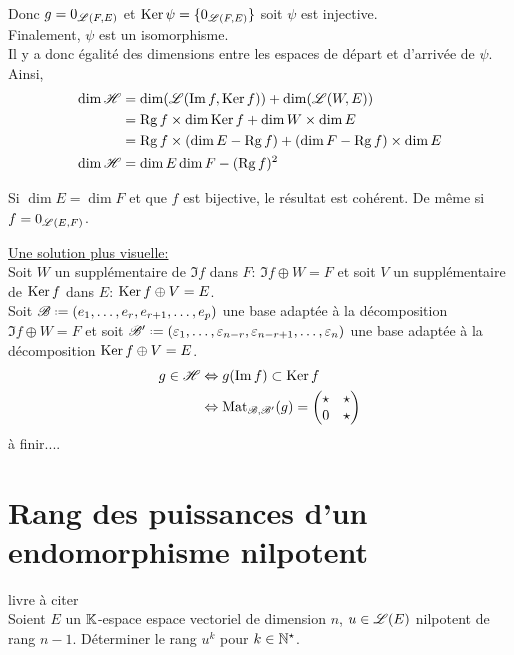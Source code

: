 \begin{solution}
\begin{itemize}
\begin{itemize}
            Donc $g = 0_{\mathscr{L}(F, E)}$ et $\mathrm{Ker}\, \psi = \{ 0_{\mathscr{L}(F, E)} \}$ soit $\psi$ est injective. \\
            Finalement, $\psi$ est un isomorphisme. \\
            Il y a donc égalité des dimensions entre les espaces de départ et d'arrivée de $\psi$. Ainsi,
            \begin{align*}
                \dim \mathscr{H} &= \dim(\mathscr{L}(\Im f, \mathrm{Ker}\, f)) + \dim (\mathscr{L}(W, E)) \\
                &= \mathrm{Rg}\, f \times \dim \mathrm{Ker}\, f + \dim W \times \dim E \\
                &= \mathrm{Rg}\, f \times (\dim E - \mathrm{Rg}\, f) + (\dim F - \mathrm{Rg}\, f) \times \dim E \\
                \dim \mathscr{H} &= \dim E \dim F - (\mathrm{Rg}\, f)^2
            \end{align*}
        \end{itemize}
        \begin{remarque}
            Si $\dim E = \dim F$ et que $f$ est bijective, le résultat est cohérent. De même si $f = 0_{\mathscr{L}(E, F)}$.
        \end{remarque}
    \end{itemize}
    \underline{Une solution plus visuelle:} \\
    Soit $W$ un supplémentaire de $\Im f$ dans $F$: $\Im f \oplus W = F$ et soit $V$ un supplémentaire de $\mathrm{Ker}\, f$ dans $E$: $\mathrm{Ker}\, f \oplus V = E$. \\
    Soit $\mathscr{B} \defeq (e_1, \dots, e_r, e_{r+1}, \dots, e_p)$ une base adaptée à la décomposition $\Im f \oplus W = F$ et soit $\mathscr{B}' \defeq (\varepsilon_1, \dots, \varepsilon_{n-r}, \varepsilon_{n-r+1}, \dots, \varepsilon_n)$ une base adaptée à la décomposition $\mathrm{Ker}\, f \oplus V = E$.
    \begin{align*}
        g \in \mathscr{H} &\Leftrightarrow g(\Im f) \subset \mathrm{Ker}\, f \\
        &\Leftrightarrow \mathrm{Mat}_{\mathscr{B}, \mathscr{B}'}(g) = 
        \begin{pmatrix}
            \star & \star \\
            0 & \star
        \end{pmatrix}
    \end{align*}
    à finir....
\end{solution}

\section{Rang des puissances d'un endomorphisme nilpotent} 
\begin{exercice}
    livre à citer \\
    Soient $E$ un $\mathbb{K}$-espace espace vectoriel de dimension $n$, $u \in \mathscr{L}(E)$ nilpotent de rang $n-1$. Déterminer le rang $u^k$ pour $k \in \mathbb{N}^\star$. 
\end{exercice}

